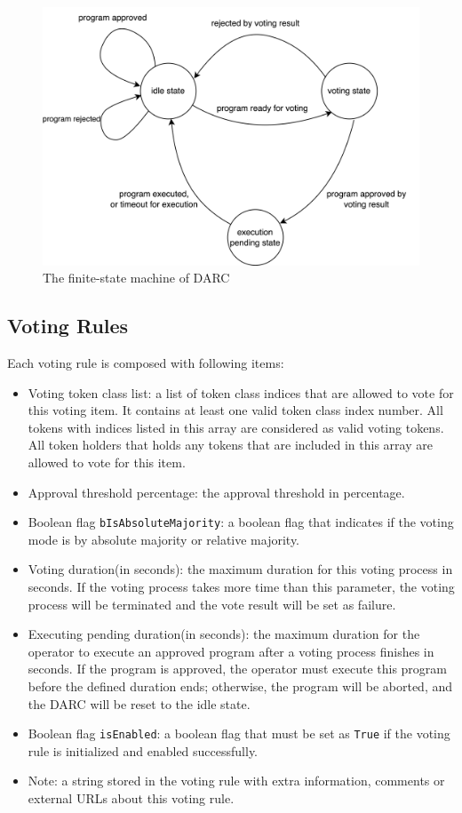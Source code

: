 \documentclass[main.tex]{subfiles}
\begin{document}
\begin{figure}
\centering
\includegraphics[width=1\linewidth]{finite_state_machine.drawio.large.png}
\caption{\label{fig:FSM}The finite-state machine of DARC}
\end{figure}

\subsection{Voting Rules}

Each voting rule is composed with following items:
\begin{itemize}
    \item Voting token class list: a list of token class indices that are allowed to vote for this voting item. It contains at least one valid token class index number. All tokens with indices listed in this array are considered as valid voting tokens. All token holders that holds any tokens that are included in this array are allowed to vote for this item.
    \item Approval threshold percentage: the approval threshold in percentage. 
    \item Boolean flag \texttt{bIsAbsoluteMajority}: a boolean flag that indicates if the voting mode is by absolute majority or relative majority.
    \item Voting duration(in seconds): the maximum duration for this voting process in seconds. If the voting process takes more time than this parameter, the voting process will be terminated and the vote result will be set as failure.
    \item Executing pending duration(in seconds): the maximum duration for the operator to execute an approved program after a voting process finishes in seconds. If the program is approved, the operator must execute this program before the defined duration ends; otherwise, the program will be aborted, and the DARC will be reset to the idle state.
    \item Boolean flag \texttt{isEnabled}: a boolean flag that must be set as \texttt{True} if the voting rule is initialized and enabled successfully.
    \item Note: a string stored in the voting rule with extra information, comments or external URLs about this voting rule.
\end{itemize}
\end{document}
